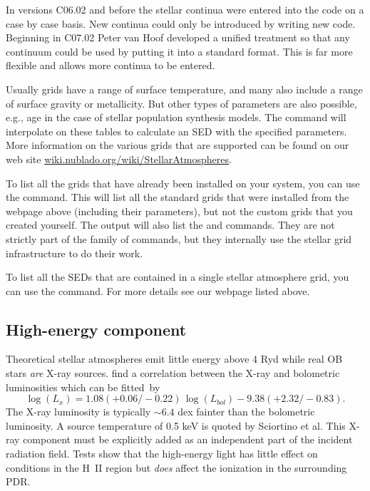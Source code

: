 In versions C06.02 and before the stellar continua were entered into
the code on a case by case basis.
New continua could only be introduced
by writing new code.
Beginning in C07.02 Peter van Hoof developed a unified
treatment so that any continuum could be used by putting
it into a standard format.
This is far more flexible and allows more continua to be entered.

Usually grids have a range of surface temperature, and many also include a
range of surface gravity or metallicity. But other types of parameters are
also possible, e.g., age in the case of stellar population synthesis models.
The  command will interpolate on these tables to
calculate an SED with the specified parameters. More information on the
various grids that are supported can be found on our web site
\href{http://wiki.nublado.org/wiki/StellarAtmospheres}{wiki.nublado.org/wiki/StellarAtmospheres}.

To list all the grids that have already been installed on your system, you can
use the  command. This will list all the
standard grids that were installed from the webpage above (including their
parameters), but not the custom grids that you created yourself.
The output will also list the 
and  commands. They are not strictly part of the
 family of commands, but they internally use the stellar
grid infrastructure to do their work.

To list all the SEDs that are contained in a single stellar atmosphere
grid, you can use the  command. For more
details see our webpage listed above.

\subsection{High-energy component}
\label{sec:StarHighEnergyComponent}

Theoretical stellar atmospheres emit little energy above 4 Ryd while
real OB stars \emph{are} X-ray sources.
\citet{Sciortino1990} find a correlation
between the X-ray and bolometric luminosities which can be fitted~by
\begin{equation}
\log \left( {L_x } \right) = 1.08\left( { + 0.06/ - 0.22} \right)\,\log
\left( {L_{bol} } \right) - 9.38\left( { + 2.32/ - 0.83} \right) .%
\end{equation}
The X-ray luminosity is typically $\sim 6.4$ dex fainter
than the bolometric luminosity.
A source temperature of 0.5 keV is quoted by Sciortino et al.
This X-ray component must be explicitly added as an
independent part of the incident radiation field.
Tests show that the high-energy light has little effect on
conditions in the H~II region but \emph{does} affect the
ionization in the surrounding PDR.

